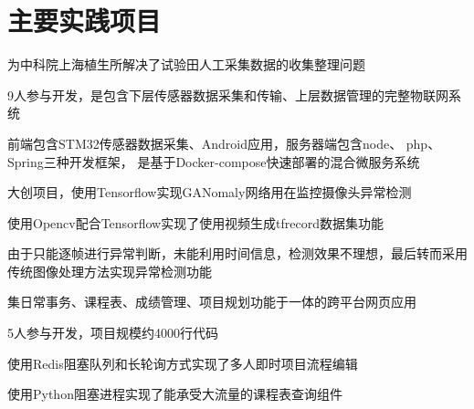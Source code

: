 \documentclass[]{deedy-resume-openfont}
\begin{document}
\begin{minipage}[t]{0.73\textwidth}
    \section{主要实践项目}
	\begin{tightemize}
		\item 为中科院上海植生所解决了试验田人工采集数据的收集整理问题
		\item 9人参与开发，是包含下层传感器数据采集和传输、上层数据管理的完整物联网系统
		\item 前端包含STM32传感器数据采集、Android应用，服务器端包含node、 php、 Spring三种开发框架， 是基于Docker-compose快速部署的混合微服务系统
	\end{tightemize}
	\sectionsep

	\begin{tightemize}
		\item 大创项目，使用Tensorflow实现GANomaly网络用在监控摄像头异常检测
		\item 使用Opencv配合Tensorflow实现了使用视频生成tfrecord数据集功能
		\item 由于只能逐帧进行异常判断，未能利用时间信息，检测效果不理想，最后转而采用 传统图像处理方法实现异常检测功能
	\end{tightemize}
    \sectionsep
    
	\begin{tightemize}
		\item 集日常事务、课程表、成绩管理、项目规划功能于一体的跨平台网页应用
		\item 5人参与开发，项目规模约4000行代码
		\item 使用Redis阻塞队列和长轮询方式实现了多人即时项目流程编辑
		\item 使用Python阻塞进程实现了能承受大流量的课程表查询组件
	\end{tightemize}
	\sectionsep


\end{minipage}
\end{document}
